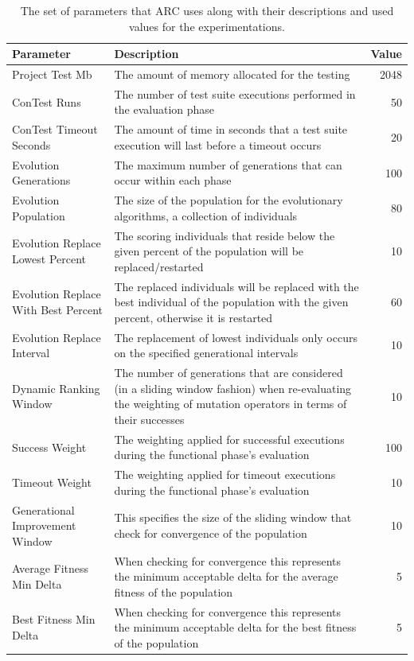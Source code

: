 \documentclass{llncs}
\begin{document}
\begin{table}[!t]
\caption{The set of parameters that ARC uses along with their descriptions and
used values for the experimentations.}
\begin{center}
\begin{tabular}{|p{3cm}|p{10cm}|r|}
\hline
\textbf{Parameter} &
\textbf{Description} &
\textbf{Value}
\\\hline
Project Test Mb & The amount of memory allocated for the testing & 2048
\\\hline
ConTest Runs & The number of test suite executions performed in the evaluation phase & 50
\\\hline
ConTest Timeout Seconds & The amount of time in seconds that a test suite execution will last before a timeout occurs & 20
\\\hline
Evolution Generations & The maximum number of generations that can occur within each phase  & 100
\\\hline
Evolution Population & The size of the population for the evolutionary algorithms, a collection of individuals& 80
\\\hline
Evolution Replace Lowest Percent & The scoring individuals that reside below the given percent of the population will be replaced/restarted & 10
\\\hline
Evolution Replace With Best Percent & The replaced individuals will be replaced with the best individual of the population with the given percent, otherwise it is restarted & 60
\\\hline
Evolution Replace Interval & The replacement of lowest individuals only occurs on the specified generational intervals & 10
\\\hline
Dynamic Ranking Window & The number of generations that are considered (in a sliding window fashion) when re-evaluating the weighting of mutation operators in terms of their successes & 10
\\\hline
Success Weight & The weighting applied for successful executions during the functional phase's evaluation & 100
\\\hline
Timeout Weight & The weighting applied for timeout executions during the functional phase's evaluation & 10
\\\hline
Generational Improvement Window & This specifies the size of the sliding window that check for convergence of the population & 10
\\\hline
Average Fitness Min Delta & When checking for convergence this represents the minimum acceptable delta for the average fitness of the population & 5
\\\hline
Best Fitness Min Delta & When checking for convergence this represents the minimum acceptable delta for the best fitness of the population & 5
\\\hline
\end{tabular}
\label{tbl:used_parameters}
\end{center}
\end{table}
\end{document}
